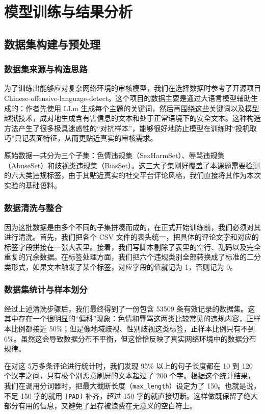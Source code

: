 \documentclass[twoside]{thesis-cls-Miya} %
\begin{document}
\chapter{模型训练与结果分析}

\section{数据集构建与预处理}
\subsection{数据集来源与构造思路}
为了训练出能够应对复杂网络环境的审核模型，我们在选择数据时参考了开源项目 Chinese-offensive-language-detect。这个项目的数据主要是通过大语言模型辅助生成的：作者先使用 LLm 生成每个主题的关键词，然后再围绕这些关键词以及模型越狱技术，成对地生成含有害信息的文本和处于正常语境下的安全文本。这种构造方法产生了很多极具迷惑性的“对抗样本”，能够很好地防止模型在训练时“投机取巧”只记表面特征，从而更贴近真实的审核需求。

原始数据一共分为三个子集：色情违规集（SexHarmSet）、辱骂违规集（AbuseSet）和歧视类违规集（BiasSet）。这三大子集刚好覆盖了本课题需要检测的六大类违规标签，由于其贴近真实的社交平台评论风格，我们直接将其作为本次实验的基础语料。

\subsection{数据清洗与整合}
因为这批数据是由多个不同的子集拼凑而成的，在正式开始训练前，我们必须对其进行清洗。首先，我们把各个 CSV 文件的表头统一，把具体的评论文字和对应的标签字段拼接在一张大表里。接着，我们写脚本剔除了表里的空行、乱码以及完全重复的冗余数据。在标签处理方面，我们把六个违规类别全部转换成了标准的二分类形式，如果文本触发了某个标签，对应字段的值就记为 1，否则记为 0。

\subsection{数据集统计与样本划分}
经过上述清洗步骤后，我们最终得到了一份包含 53509 条有效记录的数据集。这其中存在一个很明显的“偏科”现象：色情和辱骂这两类比较常见的违规内容，正样本比例都接近 50\%；但是像地域歧视、性别歧视这类标签，正样本比例只有不到 6\%。虽然这会导致数据分布不平衡，但这恰恰反映了真实网络环境中的数据分布规律。

在对这 5万多条评论进行统计时，我们发现 95\% 以上的句子长度都在 10 到 120 个汉字之间，只有极个别恶意刷屏的文本超过了 200 个字。根据这个统计结果，我们在调用分词器时，把最大截断长度（\texttt{max\_length}）设定为了 150。也就是说，不足 150 字的就用 \texttt{{[}PAD{]}} 补齐，超过 150 字的就直接切断。这样做既保留了绝大部分有用的信息，又避免了显存被浪费在无意义的空白符上。
\end{document}
